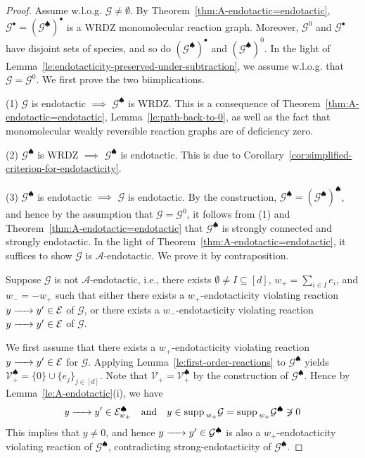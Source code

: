 \documentclass[10pt]{amsart}
\numberwithin{equation}{section}
\theoremstyle{plain}
\theoremstyle{definition}
\theoremstyle{remark}
\newcommand{\cA}{\mathcal{A}}
\newcommand{\cE}{\mathcal{E}}
\newcommand{\cG}{\mathcal{G}}
\newcommand{\cI}{I}
\newcommand{\cV}{\mathcal{V}}
\newcommand{\supp}{{\rm supp\,}}
\begin{document}
\begin{proof}
Assume w.l.o.g. $\cG\neq\emptyset$. By Theorem~\ref{thm:A-endotactic=endotactic}, $\cG^{\bullet}=(\cG^{\spadesuit})^{\bullet}$ is a WRDZ monomolecular reaction graph. Moreover, $\cG^0$ and $\cG^{\bullet}$ have disjoint sets of species, and so do $(\cG^{\spadesuit})^{\bullet}$ and $(\cG^{\spadesuit})^0$.
In the light of Lemma~\ref{le:endotacticity-preserved-under-subtraction}, we assume w.l.o.g. that $\cG=\cG^0$. We first prove the two biimplications.
\medskip

\noindent(1) $\cG$ is endotactic $\implies$ $\cG^{\spadesuit}$ is WRDZ. This is a consequence of Theorem~\ref{thm:A-endotactic=endotactic}, Lemma~\ref{le:path-back-to-0}, as well as the fact that monomolecular weakly reversible reaction graphs are of deficiency zero.
\medskip

\noindent(2) $\cG^{\spadesuit}$ is WRDZ  $\implies$ $\cG^{\spadesuit}$ is endotactic. This is due to Corollary~\ref{cor:simplified-criterion-for-endotacticity}.
\medskip

\noindent(3) $\cG^{\spadesuit}$ is endotactic $\implies$ $\cG$ is endotactic. By the construction, $\cG^{\spadesuit}=(\cG^{\spadesuit})^{\spadesuit}$, and hence by the assumption that $\cG=\cG^0$, it follows from (1) and Theorem~\ref{thm:A-endotactic=endotactic} that $\cG^{\spadesuit}$ is strongly connected and strongly endotactic. In the light of Theorem~\ref{thm:A-endotactic=endotactic}, it suffices to show $\cG$ is $\cA$-endotactic. We prove it by contraposition.

Suppose $\cG$ is not $\cA$-endotactic, i.e., there exists $\emptyset\neq\cI\subseteq[d]$, $w_+=\sum_{i\in\cI}e_i$, and $w_-=-w_+$ such that either there exists a $w_+$-endotacticity violating reaction $y\ce{->[]} y'\in\cE$ of $\cG$, or there exists a $w_-$-endotacticity violating reaction $y\ce{->[]} y'\in\cE$ of $\cG$.

We first assume that there exists a $w_+$-endotacticity violating reaction $y\ce{->[]} y'\in\cE$ for $\cG$. Applying Lemma~\ref{le:first-order-reactions} to $\cG^{\spadesuit}$ yields $\cV^{\spadesuit}_+=\{0\}\cup\{e_j\}_{j\in[d]}$. Note that $\cV_+=\cV^{\spadesuit}_+$ by the construction of $\cG^{\spadesuit}$. Hence by Lemma~\ref{le:A-endotactic}(i), we have $$y\ce{->[]} y'\in\cE^{\spadesuit}_{w_+}\quad \text{and}\quad y\in\supp_{w_+}\cG=\supp_{w_+}\cG^{\spadesuit}\not\ni 0$$ This implies that $y\neq0$, and hence $y\ce{->[]} y'\in\cG^{\spadesuit}$ is also a $w_+$-endotacticity violating reaction of $\cG^{\spadesuit}$, contradicting strong-endotacticity of $\cG^{\spadesuit}$.


\end{proof}
\end{document}
